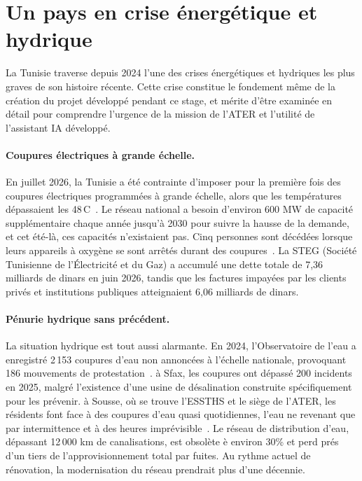 \documentclass[12pt,a4paper,oneside]{report}
\begin{document}
\section{Un pays en crise \'{e}nerg\'{e}tique et hydrique}



La Tunisie traverse depuis 2024 l'une des crises \'{e}nerg\'{e}tiques et hydriques les plus graves de son histoire r\'{e}cente. Cette crise constitue le fondement m\^{e}me de la cr\'{e}ation du projet d\'{e}velopp\'{e} pendant ce stage, et m\'{e}rite d'\^{e}tre examin\'{e}e en d\'{e}tail pour comprendre l'urgence de la mission de l'ATER et l'utilit\'{e} de l'assistant IA d\'{e}velopp\'{e}.



\paragraph{Coupures \'{e}lectriques \`{a} grande \'{e}chelle.}

En juillet 2026, la Tunisie a \'{e}t\'{e} contrainte d'imposer pour la premi\`{e}re fois des coupures \'{e}lectriques programm\'{e}es \`{a} grande \'{e}chelle, alors que les temp\'{e}ratures d\'{e}passaient les 48\,{\textdegree}C~\cite{irena2024}. Le r\'{e}seau national a besoin d'environ 600 MW de capacit\'{e} suppl\'{e}mentaire chaque ann\'{e}e jusqu'\`{a} 2030 pour suivre la hausse de la demande, et cet \'{e}t\'{e}-l\`{a}, ces capacit\'{e}s n'existaient pas. Cinq personnes sont d\'{e}c\'{e}d\'{e}es lorsque leurs appareils \`{a} oxyg\`{e}ne se sont arr\^{e}t\'{e}s durant des coupures~\cite{anme2024}. La STEG (Soci\'{e}t\'{e} Tunisienne de l'\'{E}lectricit\'{e} et du Gaz) a accumul\'{e} une dette totale de 7,36 milliards de dinars en juin 2026, tandis que les factures impay\'{e}es par les clients priv\'{e}s et institutions publiques atteignaient 6,06 milliards de dinars.



\paragraph{P\'{e}nurie hydrique sans pr\'{e}c\'{e}dent.}

La situation hydrique est tout aussi alarmante. En 2024, l'Observatoire de l'eau a enregistr\'{e} 2\,153 coupures d'eau non annonc\'{e}es \`{a} l'\'{e}chelle nationale, provoquant 186 mouvements de protestation~\cite{cder}. \`{a} Sfax, les coupures ont d\'{e}pass\'{e} 200 incidents en 2025, malgr\'{e} l'existence d'une usine de d\'{e}salination construite sp\'{e}cifiquement pour les pr\'{e}venir. \`{a} Sousse, o\`{u} se trouve l'ESSTHS et le si\`{e}ge de l'ATER, les r\'{e}sidents font face \`{a} des coupures d'eau quasi quotidiennes, l'eau ne revenant que par intermittence et \`{a} des heures impr\'{e}visible~\cite{irena2024}. Le r\'{e}seau de distribution d'eau, d\'{e}passant 12\,000 km de canalisations, est obsol\`{e}te \`{e} environ 30\% et perd pr\'{e}s d'un tiers de l'approvisionnement total par fuites. Au rythme actuel de r\'{e}novation, la modernisation du r\'{e}seau prendrait plus d'une d\'{e}cennie.
\end{document}
